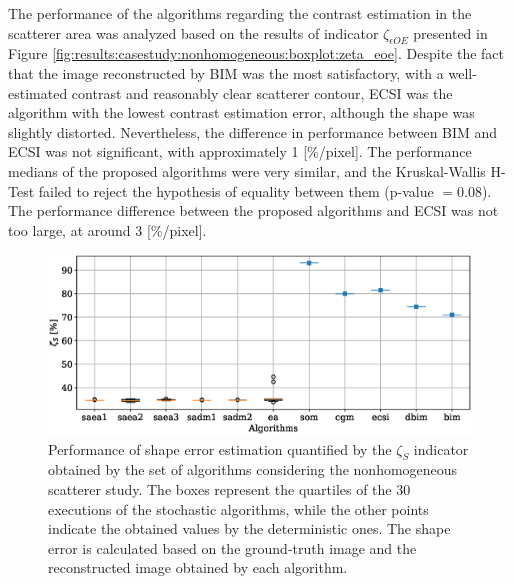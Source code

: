 			The performance of the algorithms regarding the contrast estimation in the scatterer area was analyzed based on the results of indicator $\zeta_{\epsilon OE}$ presented in Figure \ref{fig:results:casestudy:nonhomogeneous:boxplot:zeta_eoe}. Despite the fact that the image reconstructed by BIM was the most satisfactory, with a well-estimated contrast and reasonably clear scatterer contour, ECSI was the algorithm with the lowest contrast estimation error, although the shape was slightly distorted. Nevertheless, the difference in performance between BIM and ECSI was not significant, with approximately 1 [\%/pixel]. The performance medians of the proposed algorithms were very similar, and the Kruskal-Wallis H-Test failed to reject the hypothesis of equality between them (p-value $= 0.08$). The performance difference between the proposed algorithms and ECSI was not too large, at around 3 [\%/pixel].
		
			\begin{figure}
				\centering
				\includegraphics[width=.9\textwidth]{./figuras/casestudy/nonhomogeneous/boxplot_zeta_s}
				\caption[Performance of shape error estimation quantified by the $\zeta_S$ indicator obtained by the set of algorithms considering the nonhomogeneous scatterer case study.]{Performance of shape error estimation quantified by the $\zeta_S$ indicator obtained by the set of algorithms considering the nonhomogeneous scatterer study. The boxes represent the quartiles of the 30 executions of the stochastic algorithms, while the other points indicate the obtained values by the deterministic ones. The shape error is calculated based on the ground-truth image and the reconstructed image obtained by each algorithm.}
				\label{fig:results:casestudy:nonhomogeneous:boxplot:zeta_s}
			\end{figure}
		
			
